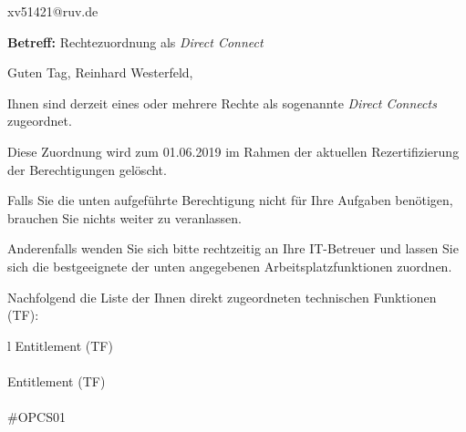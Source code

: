 \documentclass[a4paper,landscape,12pt]{letter}
\begin{document}
\begin{letter}{xv51421@ruv.de\hfill \break}
\begin{normalsize}
	\opening{\textbf{Betreff:} Rechtezuordnung als \emph{Direct Connect}}
	\begin{normalsize} \hfill
	\end{normalsize}

	\begin{normalsize}
		Guten Tag, 
	Reinhard Westerfeld, \hfill \break
	\end{normalsize}
	\end{normalsize}
	
\begin{normalsize}
	Ihnen sind derzeit eines oder mehrere Rechte als sogenannte \emph{Direct Connects} zugeordnet.
	
	Diese Zuordnung wird zum 01.06.2019 im Rahmen der aktuellen Rezertifizierung der Berechtigungen gelöscht.
	
	Falls Sie die unten aufgeführte Berechtigung nicht für Ihre Aufgaben benötigen, 
	brauchen Sie nichts weiter zu veranlassen.
	
	Anderenfalls wenden Sie sich bitte rechtzeitig an Ihre IT-Betreuer 
	und lassen Sie sich die bestgeeignete der unten angegebenen Arbeitsplatzfunktionen zuordnen.
	\end{normalsize}
	
\begin{normalsize}
	Nachfolgend die Liste der Ihnen direkt zugeordneten technischen Funktionen (TF):

	\begin{longtable}{l}
		Entitlement (TF) \\ \hline
		\endfirsthead
		\\\hline
		Entitlement (TF) \\ \hline
		\endhead %
		\multicolumn{1}{r@{}}{Fortsetzung \ldots}\\
		\endfoot
		\hline
		\endlastfoot
	\#OPCS01\\
	\end{longtable}
	\end{normalsize}
	

\end{letter}
\end{document}
